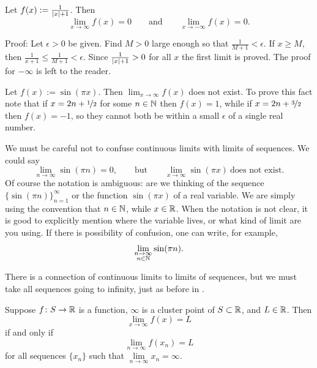 \begin{example}
Let $f(x) := \frac{1}{\left\lvert {x} \right\rvert+1}$.  Then
\begin{equation*}
\lim_{x\to \infty} f(x) = 0 \qquad \text{and} \qquad
\lim_{x\to -\infty} f(x) = 0 .
\end{equation*}

Proof:
Let $\epsilon > 0$ be given.  Find $M > 0$ large enough
so that $\frac{1}{M+1} < \epsilon$.  If
$x \geq M$, then $\frac{1}{x+1} \leq \frac{1}{M+1} < \epsilon$.
Since $\frac{1}{\left\lvert {x} \right\rvert+1} > 0$ for all $x$ the first limit is proved.
The proof for $-\infty$ is left to the reader.
\end{example}

\begin{example}
Let $f(x) := \sin(\pi x)$.  Then $\lim_{x\to\infty} f(x)$ does not exist.
To prove this fact note that if $x = 2n+\nicefrac{1}{2}$ for some $n \in {\mathbb{N}}$ then $f(x)=1$,
while if $x = 2n+\nicefrac{3}{2}$ then $f(x)=-1$, so they cannot both be
within a small $\epsilon$ of a single real number.

We must be careful not to confuse continuous limits with limits of sequences.
We could say
\begin{equation*}
\lim_{n \to \infty} \sin(\pi n) = 0, \qquad \text{but} \qquad
\lim_{x \to \infty} \sin(\pi x) ~ \text{does not exist}.
\end{equation*}
Of course the notation is ambiguous: are we thinking of the
sequence $\{ \sin (\pi n) \}_{n=1}^\infty$ or the function $\sin(\pi x)$
of a real variable.  We are simply using the convention
that $n \in {\mathbb{N}}$, while $x \in {\mathbb{R}}$.  When the notation is not clear,
it is good to explicitly mention where the variable lives, or what kind
of limit are you using.  If there is possibility of confusion, one can
write, for example,
\begin{equation*}
\lim_{\substack{n \to \infty\\n \in {\mathbb{N}}}} \sin(\pi n) .
\end{equation*}
\end{example}

There is a connection of continuous limits to limits of sequences, but we must take all
sequences going to infinity, just as before in .

\begin{lemma} \label{seqflimitinf:lemma}
Suppose $f \colon S \to {\mathbb{R}}$ is a function, $\infty$ is a cluster
point of $S \subset {\mathbb{R}}$, and $L \in {\mathbb{R}}$.  Then
\begin{equation*}
\lim_{x\to\infty} f(x) = L
\end{equation*}
if and only if
\begin{equation*}
\lim_{n\to\infty} f(x_n) = L
\end{equation*}
for all sequences $\{ x_n \}$ such that $\lim\limits_{n\to\infty} x_n = \infty$.
\end{lemma}

